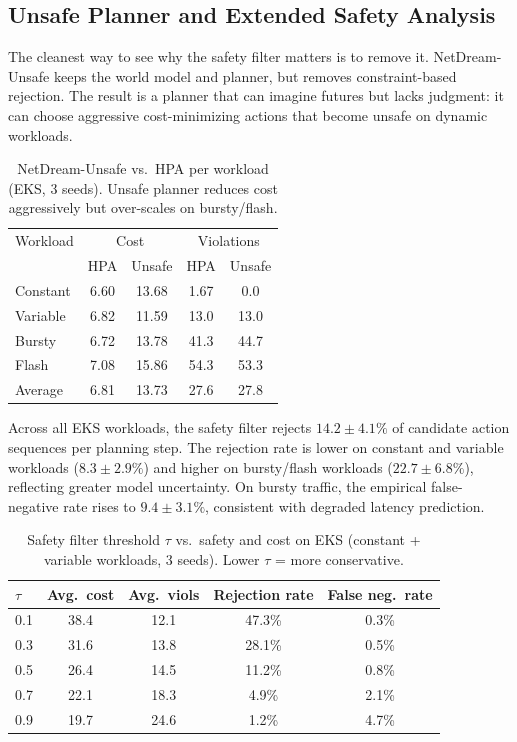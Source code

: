 \subsection{Unsafe Planner and Extended Safety Analysis}
\label{app:unsafe}

The cleanest way to see why the safety filter matters is to remove it.
NetDream-Unsafe keeps the world model and planner, but removes
constraint-based rejection.  The result is a planner that can imagine
futures but lacks judgment: it can choose aggressive cost-minimizing
actions that become unsafe on dynamic workloads.

\begin{table}[H]
\centering
\small
\caption{NetDream-Unsafe vs.\ HPA per workload (EKS, 3 seeds).
Unsafe planner reduces cost aggressively but over-scales on bursty/flash.}
\label{tab:unsafe-analysis}
\begin{tabular}{@{}lcccc@{}}
\toprule
Workload & \multicolumn{2}{c}{Cost} & \multicolumn{2}{c}{Violations} \\
         & HPA & Unsafe & HPA & Unsafe \\
\midrule
Constant & 6.60 & 13.68 & 1.67 & 0.0 \\
Variable & 6.82 & 11.59 & 13.0 & 13.0 \\
Bursty   & 6.72 & 13.78 & 41.3 & 44.7 \\
Flash    & 7.08 & 15.86 & 54.3 & 53.3 \\
\midrule
Average  & 6.81 & 13.73 & 27.6 & 27.8 \\
\bottomrule
\end{tabular}
\end{table}

Across all EKS workloads, the safety filter rejects
$14.2\pm4.1\%$ of candidate action sequences per planning step.
The rejection rate is lower on constant and variable workloads
($8.3\pm2.9\%$) and higher on bursty/flash workloads
($22.7\pm6.8\%$), reflecting greater model uncertainty.  On bursty
traffic, the empirical false-negative rate rises to $9.4\pm3.1\%$,
consistent with degraded latency prediction.

\begin{table}[H]
\centering
\small
\caption{Safety filter threshold $\tau$ vs.\ safety and cost on EKS
(constant + variable workloads, 3 seeds). Lower $\tau$ = more conservative.}
\label{tab:threshold-safety}
\begin{tabular}{@{}lcccc@{}}
\toprule
$\tau$ & Avg.\ cost & Avg.\ viols & Rejection rate & False neg.\ rate \\
\midrule
0.1 & 38.4 & 12.1 & 47.3\% & 0.3\% \\
0.3 & 31.6 & 13.8 & 28.1\% & 0.5\% \\
0.5 & 26.4 & 14.5 & 11.2\% & 0.8\% \\
0.7 & 22.1 & 18.3 & 4.9\% & 2.1\% \\
0.9 & 19.7 & 24.6 & 1.2\% & 4.7\% \\
\bottomrule
\end{tabular}
\end{table}

